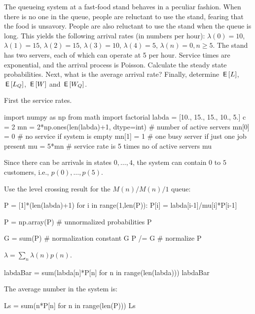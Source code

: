\begin{extra}[Hall 5.8] The queueing system at a fast-food stand behaves in a peculiar fashion.
  When there is no one in the queue, people are reluctant to use the stand, fearing that the food is unsavory.
  People are also reluctant to use the stand when the queue is long.
  This yields the following arrival rates (in numbers per hour): $\lambda(0) = 10$, $\lambda(1)=15$, $\lambda(2)=15$, $\lambda(3)=10$, $\lambda(4)=5$, $\lambda(n)=0, n\geq 5$.
  The stand has two servers, each of which can operate at 5 per hour.
  Service times are exponential, and the arrival process is Poisson.
  Calculate the steady state probabilities.
  Next, what is the average arrival rate?
  Finally, determine $\,\mathsf{E}\left[L\right]$, $\,\mathsf{E}\left[L_Q\right]$, $\,\mathsf{E}\left[W\right]$ and $\,\mathsf{E}\left[W_Q\right]$.
\begin{solution}
First the service rates.
\begin{pyconsole}
import numpy as np
from math import factorial
labda = [10., 15., 15., 10., 5.]
c = 2
mn = 2*np.ones(len(labda)+1, dtype=int)  # number of active servers
mn[0] = 0  # no service if system is empty
mn[1] = 1  # one busy server if just one job present
mu = 5*mn # service rate is 5 times no of active servers
mu
\end{pyconsole}

Since there can be arrivals in states $0,\ldots, 4$,  the system can contain $0$ to $5$ customers, i.e., $p(0),\ldots, p(5)$.

Use the level crossing result for the $M(n)/M(n)/1$ queue:

\begin{pyconsole}
P = [1]*(len(labda)+1)
for i in range(1,len(P)):
    P[i] = labda[i-1]/mu[i]*P[i-1]

P = np.array(P) # unnormalized probabilities
P
\end{pyconsole}

\begin{pyconsole}
G = sum(P) # normalization constant
G
P /= G # normalize
P 
\end{pyconsole} 

$\lambda = \sum_{n}\lambda(n) p(n)$.

\begin{pyconsole}
labdaBar = sum(labda[n]*P[n] for n in range(len(labda)))
labdaBar
\end{pyconsole}


The average number in the system is: 

\begin{pyconsole}
Ls = sum(n*P[n] for n in range(len(P)))
Ls
\end{pyconsole}



\end{solution}
\end{extra}
